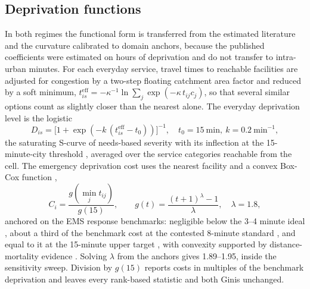 \documentclass[9pt,twocolumn]{article}
\begin{document}
\subsection*{Deprivation functions}
In both regimes the functional form is transferred from the estimated
literature and the curvature calibrated to domain anchors, because the
published coefficients were estimated on hours of deprivation and do not
transfer to intra-urban minutes. For each everyday service, travel times
to reachable facilities are adjusted for congestion by a two-step floating
catchment area factor \citep{luo2003measures,luo2009enhanced} and reduced
by a soft minimum,
$t^{\mathrm{eff}}_{is} = -\kappa^{-1}\ln\sum_j \exp(-\kappa\, t_{ij} c_j)$,
so that several similar options count as slightly closer than the nearest
alone. The everyday deprivation level is the logistic
\begin{equation}
D_{is} = \big[1 + \exp(-k\,(t^{\mathrm{eff}}_{is} - t_0))\big]^{-1},
\quad t_0 = 15\ \mathrm{min},\ k = 0.2\ \mathrm{min}^{-1},
\end{equation}
the saturating S-curve of needs-based severity \citep{wang2017deprivation}
with its inflection at the 15-minute-city threshold
\citep{moreno2021fifteenminute}, averaged over the service categories
reachable from the cell. The emergency deprivation cost uses the nearest
facility and a convex Box-Cox function
\citep{cantillo2018discrete,delgadolindeman2019ambulance},
\begin{equation}
C_i = \frac{g(\min_j t_{ij})}{g(15)}, \qquad
g(t) = \frac{(t+1)^{\lambda} - 1}{\lambda}, \quad \lambda = 1.8,
\end{equation}
anchored on the EMS response benchmarks: negligible below the 3--4 minute
ideal \citep{pons2005response,vo2020vulnerable}, about a third of the
benchmark cost at the contested 8-minute standard
\citep{pons2005response,blanchard2012response,khan2026melbourne}, and
equal to it at the 15-minute upper target \citep{peleg2004ems}, with
convexity supported by distance-mortality evidence
\citep{nicholl2007distance}. Solving $\lambda$ from the anchors gives
1.89--1.95, inside the sensitivity sweep. Division by $g(15)$ reports
costs in multiples of the benchmark deprivation and leaves every
rank-based statistic and both Ginis unchanged.
\end{document}
